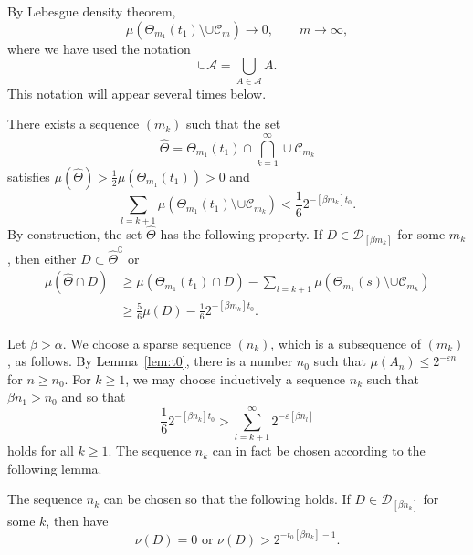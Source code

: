 \documentclass[AHL,Unicode,longabstracts]{cedram}
\begin{document}
By Lebesgue density theorem,
\[
\mu (\Theta_{m_1} (t_1) \setminus \cup \mathscr{C}_m) \to 0, \qquad m
\to \infty,
\]
where we have used the notation
\[
\cup \mathscr{A} = \bigcup_{A \in \mathscr{A}} A.
\]
This notation will appear several times below.

There exists a sequence $(m_k)$ such that the set
\[
\hat{\Theta} = \Theta_{m_1} (t_1) \cap \bigcap_{k=1}^\infty \cup \mathscr{C}_{m_k}
\]
satisfies $\mu (\hat{\Theta}) > \frac{1}{2} \mu (\Theta_{m_1} (t_1)) > 0$ and
\[
\sum_{l = k + 1} \mu (\Theta_{m_1} (t_1) \setminus \cup
\mathscr{C}_{m_k}) < \frac{1}{6} 2^{-[\beta m_k] t_0}.
\]
By construction, the set $\hat{\Theta}$ has the following property. If $D \in \mathscr{D}_{[\beta m_k]}$ for some $m_k$, then either $D
\subset \hat{\Theta}^\complement$ or
\begin{align}\label{eq:propertyofDelta}
\mu (\hat{\Theta} \cap D) &\geq \mu (\Theta_{m_1} (t_1) \cap D) -
\sum_{l = k + 1} \mu (\Theta_{m_1} (s) \setminus \cup
\mathscr{C}_{m_k}) \nonumber \\ &\geq \frac{5}{6} \mu (D) -
\frac{1}{6} 2^{-[\beta m_k] t_0}.
\end{align}

Let $\beta > \alpha$. We choose a sparse sequence $(n_k)$, which is a subsequence of $(m_k)$, as follows. By Lemma~\ref{lem:t0}, there is a number $n_0$ such that $\mu (A_n) \leq 2^{- \varepsilon n}$ for $n
\geq n_0$. For $k \geq 1$, we may choose inductively a sequence $n_k$ such that $\beta n_1 > n_0$ and so that
\begin{equation}\label{eq:nk}
\frac{1}{6} 2^{- [\beta n_k] t_0} > \sum_{l = k+1}^\infty 2^{- \varepsilon [\beta n_l]}
\end{equation}
holds for all $k \geq 1$. The sequence $n_k$ can in fact be chosen according to the following lemma.

\begin{lemm}\label{lem:nu}
The sequence $n_k$ can be chosen so that the following holds. If $D \in \mathscr{D}_{[\beta n_k]}$ for some $k$, then have
\[
\nu (D) = 0 \text{ or } \nu (D) > 2^{- t_0 [\beta n_k] - 1}.
\]
\end{lemm}
\end{document}

